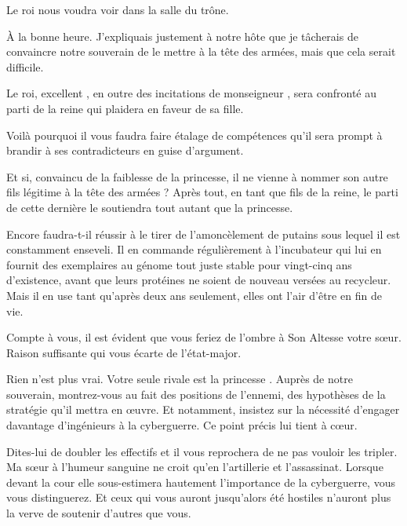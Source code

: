 \scene

\StageDirII{\elena, \general, \alexas}


\begin{drama}
  \alexasspeaks Le roi nous voudra voir dans la salle du trône.

  \elenaspeaks À la bonne heure. J’expliquais justement à notre hôte que je tâcherais de convaincre notre souverain de le mettre à la tête des armées, mais que cela serait difficile.

  \alexasspeaks Le roi, excellent \general, en outre des incitations de monseigneur \elena{}, sera confronté au parti de la reine qui plaidera en faveur de sa fille.

  \elenaspeaks Voilà pourquoi il vous faudra faire étalage de compétences qu’il sera prompt à brandir à ses contradicteurs en guise d’argument.

  \generalspeaks Et si, convaincu de la faiblesse de la princesse, il ne vienne à nommer son autre fils légitime à la tête des armées ? Après tout, en tant que fils de la reine, le parti de cette dernière le soutiendra tout autant que la princesse.

  \elenaspeaks Encore faudra-t-il réussir à le tirer de l’amoncèlement de putains sous lequel il est constamment enseveli.
  Il en commande régulièrement à l’incubateur qui lui en fournit des exemplaires au génome tout juste stable pour vingt-cinq
  ans d’existence, avant que leurs protéines ne soient de nouveau versées au recycleur. Mais il en use tant qu’après deux ans seulement, elles ont l’air d’être en fin de vie.


  \generalspeaks {} Compte à vous, il est évident que vous feriez de l’ombre à Son Altesse votre sœur. Raison suffisante qui vous écarte de l’état-major.

  \elenaspeaks Rien n’est plus vrai. Votre seule rivale est la princesse \princesse. Auprès de notre souverain, montrez-vous au fait des positions de l’ennemi, des hypothèses de la stratégie qu’il mettra en œuvre. Et notamment, insistez sur la nécessité d’engager davantage d’ingénieurs à la cyberguerre. Ce point précis lui tient à cœur. 

  Dites-lui de doubler les effectifs et il vous reprochera de ne pas vouloir les tripler. Ma sœur à l’humeur sanguine ne croit qu’en l’artillerie et l’assassinat. Lorsque devant la cour elle sous-estimera hautement l’importance de la cyberguerre, vous vous distinguerez. Et ceux qui vous auront jusqu’alors été hostiles n’auront plus la verve de soutenir d’autres que vous.


\end{drama}
